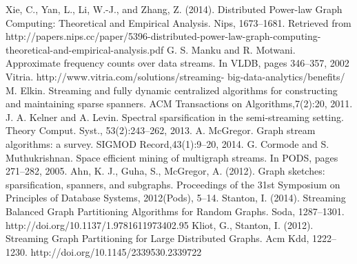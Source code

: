 \documentclass[12pt]{report}
\numberwithin{figure}{section}
\numberwithin{table}{section}
\begin{document}
\begin{thebibliography}{1}
  Xie, C., Yan, L., Li, W.-J., and Zhang, Z. (2014). Distributed Power-law Graph Computing: Theoretical and Empirical Analysis. Nips, 1673--1681. Retrieved from http://papers.nips.cc/paper/5396-distributed-power-law-graph-computing-theoretical-and-empirical-analysis.pdf
  G. S. Manku and R. Motwani. Approximate frequency counts over data streams. In VLDB, pages 346–357, 2002
   Vitria. http://www.vitria.com/solutions/streaming- big-data-analytics/benefits/
  M. Elkin. Streaming and fully dynamic centralized algorithms for constructing and maintaining sparse spanners. ACM Transactions on Algorithms,7(2):20, 2011.
   J. A. Kelner and A. Levin. Spectral sparsification in the semi-streaming setting. Theory Comput. Syst., 53(2):243–262, 2013.
  A. McGregor. Graph stream algorithms: a survey. SIGMOD Record,43(1):9–20, 2014.
  G. Cormode and S. Muthukrishnan. Space efficient mining of multigraph streams. In PODS, pages 271–282, 2005.
  Ahn, K. J., Guha, S.,  McGregor, A. (2012). Graph sketches: sparsification, spanners, and subgraphs. Proceedings of the 31st Symposium on Principles of Database Systems, 2012(Pods), 5–14.
  Stanton, I. (2014). Streaming Balanced Graph Partitioning Algorithms for Random Graphs. Soda, 1287–1301. http://doi.org/10.1137/1.9781611973402.95
  Kliot, G.,  Stanton, I. (2012). Streaming Graph Partitioning for Large Distributed Graphs. Acm Kdd, 1222–1230. http://doi.org/10.1145/2339530.2339722
  
  
  
\end{thebibliography}
\end{document}
